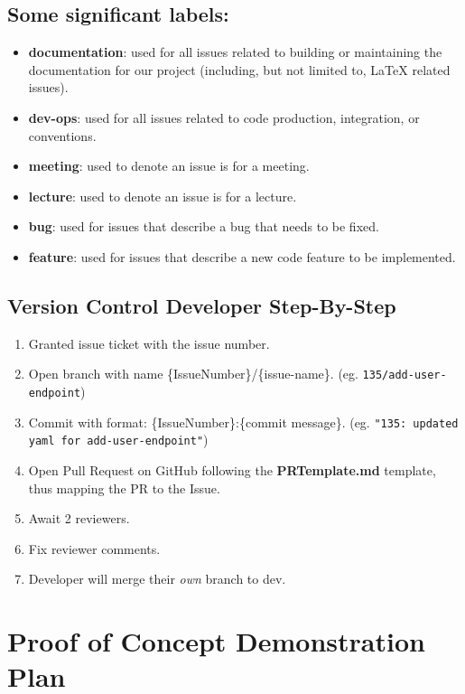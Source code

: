 \documentclass{article}
\def\code#1{\texttt{#1}}
\begin{document}
\subsection{Some significant labels:}

\begin{itemize}
	\item \textbf{documentation}: used for all issues related to building or maintaining the documentation for our project (including, but not limited to, LaTeX related issues).
	\item \textbf{dev-ops}: used for all issues related to code production, integration, or conventions.
	\item \textbf{meeting}: used to denote an issue is for a meeting.
	\item \textbf{lecture}: used to denote an issue is for a lecture.
	\item \textbf{bug}: used for issues that describe a bug that needs to be fixed.
	\item \textbf{feature}: used for issues that describe a new code feature to be implemented.
\end{itemize}

\subsection{Version Control Developer Step-By-Step}

\begin{enumerate}
	\item Granted issue ticket with the issue number.
	\item Open branch with name \{IssueNumber\}/\{issue-name\}. (eg. \code{135/add-user-endpoint})
	\item Commit with format: \{IssueNumber\}:\{commit message\}. (eg. \code{"135: updated yaml for add-user-endpoint"})
	\item Open Pull Request on GitHub following the \textbf{PRTemplate.md} template, thus mapping the PR to the Issue.
	\item Await 2 reviewers.
	\item Fix reviewer comments.
	\item Developer will merge their \emph{own} branch to dev.
\end{enumerate}

\section{Proof of Concept Demonstration Plan}
\end{document}
